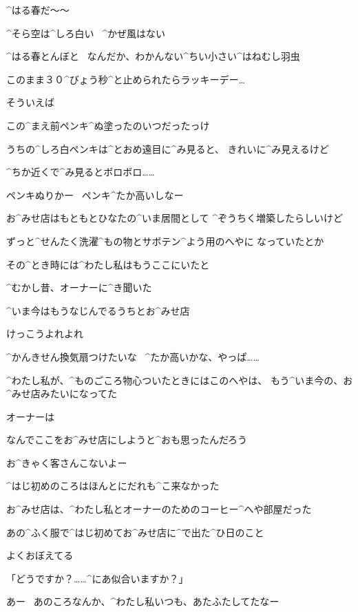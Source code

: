 \page[27]
\Alpha ^{はる}{春}だ〜〜

\Alpha ^{そら}{空}は^{しろ}{白}い
\ ^{かぜ}{風}はない

\Alpha ^{はる}{春}とんぼと
\ なんだか、わかんない^{ちい}{小}さい^{はねむし}{羽虫}

\page[28]
\Alpha このまま３０^{びょう}{秒}^{と}{止}められたらラッキーデー…

\page[29]
\Alpha そういえば

\Alpha この^{まえ}{前}ペンキ^{ぬ}{塗}ったのいつだったっけ

\Alpha うちの^{しろ}{白}ペンキは^{とおめ}{遠目}に^{み}{見}ると、
きれいに^{み}{見}えるけど

\Alpha ^{ちか}{近}くで^{み}{見}るとボロボロ……

\Alpha ペンキぬりかー
\ ペンキ^{たか}{高}いしなー

\page[30]
\Alpha お^{みせ}{店}はもともとひなたの^{いま}{居間}として
^{ぞうちく}{増築}したらしいけど

\Alpha ずっと^{せんたく}{洗濯}^{もの}{物}とサボテン^{よう}{用}のへやに
なっていたとか

\Alpha その^{とき}{時}には^{わたし}{私}はもうここにいたと

\Alpha ^{むかし}{昔}、オーナーに^{き}{聞}いた

\page[31]
\Alpha ^{いま}{今}はもうなじんでるうちとお^{みせ}{店}

\Alpha けっこうよれよれ

\Alpha ^{かんきせん}{換気扇}つけたいな
\ ^{たか}{高}いかな、やっぱ……

\page[32]
\Alpha ^{わたし}{私}が、^{ものごころ}{物心}ついたときにはこのへやは、
もう^{いま}{今}の、お^{みせ}{店}みたいになってた

\Alpha オーナーは

\Alpha なんでここをお^{みせ}{店}にしようと^{おも}{思}ったんだろう

\Alpha お^{きゃく}{客}さんこないよー

\page[33]
\Alpha ^{はじ}{初}めのころはほんとにだれも^{こ}{来}なかった

\Alpha お^{みせ}{店}は、^{わたし}{私}とオーナーのためのコーヒー^{へや}{部屋}だった

\page[34]
\Alpha あの^{ふく}{服}で^{はじ}{初}めてお^{みせ}{店}に^{で}{出}た^{ひ}{日}のこと

\Alpha よくおぼえてる

\Alpha 「どうですか？……^{にあ}{似合}いますか？」

\page[35]
\Alpha あー
\ あのころなんか、^{わたし}{私}いつも、あたふたしてたなー

